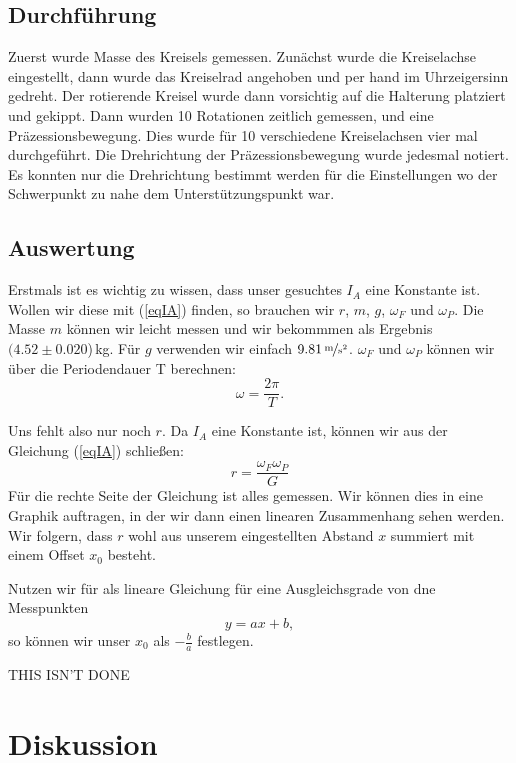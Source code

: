 \documentclass[11pt,a4paper]{article}
\begin{document}
\subsection{Durchführung}

Zuerst wurde Masse des Kreisels gemessen. Zunächst wurde die Kreiselachse eingestellt, dann wurde das Kreiselrad angehoben und per hand im Uhrzeigersinn gedreht. Der rotierende Kreisel wurde dann vorsichtig auf die Halterung platziert und gekippt. Dann wurden 10 Rotationen zeitlich gemessen, und eine Präzessionsbewegung. Dies wurde für 10 verschiedene Kreiselachsen vier mal durchgeführt. Die Drehrichtung der Präzessionsbewegung wurde jedesmal notiert. Es konnten nur die Drehrichtung bestimmt werden für die Einstellungen wo der Schwerpunkt zu nahe dem Unterstützungspunkt war.

\subsection{Auswertung}

Erstmals ist es wichtig zu wissen, dass unser gesuchtes $I_A$ eine Konstante ist. Wollen wir diese mit (\ref{eqIA}) finden, so brauchen wir $r$, $m$, $g$, $\omega_F$ und $\omega_P$. Die Masse $m$ k\"onnen wir leicht messen und wir bekommmen als Ergebnis $(4.52\pm0.020$)\,kg. F\"ur $g$ verwenden wir einfach $9.81\,\nicefrac{\mathrm{m}}{\mathrm{s}^2}$. $\omega_F$ und $\omega_P$ k\"onnen wir \"uber die Periodendauer T berechnen: 
\[
\omega=\frac{2\pi}{T}.
\]

Uns fehlt also nur noch $r$. Da $I_A$ eine Konstante ist, k\"onnen wir aus der Gleichung (\ref{eqIA}) schlie\ss en:
\begin{equation}
r=\frac{\omega_F\omega_P}{G}\label{eqgraph}
\end{equation}
F\"ur die rechte Seite der Gleichung ist alles gemessen. Wir k\"onnen dies in eine Graphik auftragen, in der wir dann einen linearen Zusammenhang sehen werden. Wir folgern, dass $r$ wohl aus unserem eingestellten Abstand $x$ summiert mit einem Offset $x_0$ besteht.

Nutzen wir f\"ur als lineare Gleichung f\"ur eine Ausgleichsgrade von dne Messpunkten
\[
y=ax+b,
\]
so k\"onnen wir unser $x_0$ als $-\frac{b}{a}$ festlegen.

THIS ISN'T DONE



\section{Diskussion}
\end{document}
